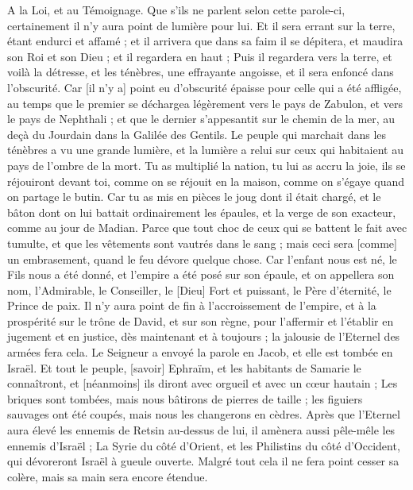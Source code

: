 \begin{multicols}{2}
A la Loi, et au Témoignage. Que s'ils ne parlent selon cette parole-ci, certainement il n'y aura point de lumière pour lui.
Et il sera errant sur la terre, étant endurci et affamé ; et il arrivera que dans sa faim il se dépitera, et maudira son Roi et son Dieu ; et il regardera en haut ;
Puis il regardera vers la terre, et voilà la détresse, et les ténèbres, une effrayante angoisse, et il sera enfoncé dans l'obscurité.
Car [il n'y a] point eu d'obscurité épaisse pour celle qui a été affligée, au temps que le premier se déchargea légèrement vers le pays de Zabulon, et vers le pays de Nephthali ; et que le dernier s'appesantit sur le chemin de la mer, au deçà du Jourdain dans la Galilée des Gentils.
\VerseOne{}Le peuple qui marchait dans les ténèbres a vu une grande lumière, et la lumière a relui sur ceux qui habitaient au pays de l'ombre de la mort.
Tu as multiplié la nation, tu lui as accru la joie, ils se réjouiront devant toi, comme on se réjouit en la maison, comme on s'égaye quand on partage le butin.
Car tu as mis en pièces le joug dont il était chargé, et le bâton dont on lui battait ordinairement les épaules, et la verge de son exacteur, comme au jour de Madian.
Parce que tout choc de ceux qui se battent le fait avec tumulte, et que les vêtements sont vautrés dans le sang ; mais ceci sera [comme] un embrasement, quand le feu dévore quelque chose.
Car l'enfant nous est né, le Fils nous a été donné, et l'empire a été posé sur son épaule, et on appellera son nom, l'Admirable, le Conseiller, le [Dieu] Fort et puissant, le Père d'éternité, le Prince de paix.
Il n'y aura point de fin à l'accroissement de l'empire, et à la prospérité sur le trône de David, et sur son règne, pour l'affermir et l'établir en jugement et en justice, dès maintenant et à toujours ; la jalousie de l'Eternel des armées fera cela.
Le Seigneur a envoyé la parole en Jacob, et elle est tombée en Israël.
Et tout le peuple, [savoir] Ephraïm, et les habitants de Samarie le connaîtront, et [néanmoins] ils diront avec orgueil et avec un cœur hautain ;
Les briques sont tombées, mais nous bâtirons de pierres de taille ; les figuiers sauvages ont été coupés, mais nous les changerons en cèdres.
Après que l'Eternel aura élevé les ennemis de Retsin au-dessus de lui, il amènera aussi pêle-mêle les ennemis d'Israël ;
La Syrie du côté d'Orient, et les Philistins du côté d'Occident, qui dévoreront Israël à gueule ouverte. Malgré tout cela il ne fera point cesser sa colère, mais sa main sera encore étendue.

\end{multicols}
